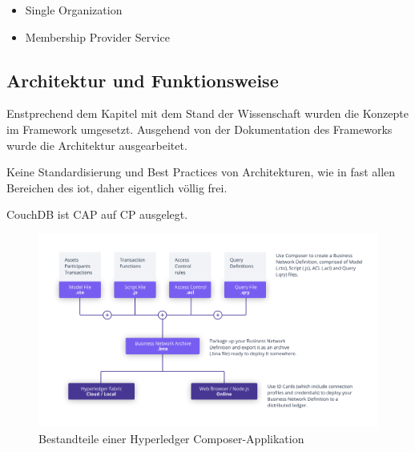         
        \begin{itemize}[noitemsep]
            \item Single Organization 
            \item Membership Provider Service
        \end{itemize}
        
    


\subsection{Architektur und Funktionsweise}
\label{sec:prototype_arch}
    Enstprechend dem Kapitel mit dem Stand der Wissenschaft wurden die Konzepte im Framework umgesetzt.
    Ausgehend von der Dokumentation des Frameworks \cite{ComposerDocs} wurde die Architektur ausgearbeitet. 
    
    Keine Standardisierung und Best Practices von Architekturen, wie in fast allen Bereichen des \gls{iot}, daher eigentlich völlig frei.
    
    CouchDB ist CAP auf CP ausgelegt.
    
    \begin{figure}[H]
		\centering
		\includegraphics[width=\textwidth]{graphics/Composer-Diagram.png}
		\caption[Bestandteile einer Hyperledger Composer-Applikation]{Bestandteile einer Hyperledger Composer-Applikation\cite{ComposerDocs}}
		\label{fig:composer_arch}
	\end{figure}
    
